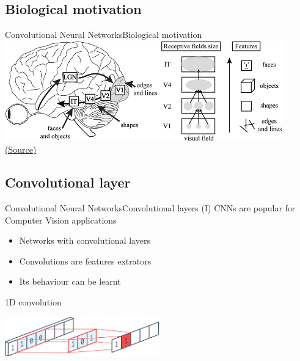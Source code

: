 \documentclass[10pt,compress]{beamer} %
\begin{document}
\subsection{Biological motivation}
\begin{frame}{Convolutional Neural Networks}{Biological motivation}
	\centering
	\includegraphics[width=0.9\textwidth]{figs/cortex.png}\\
	\scriptsize\href{https://www.researchgate.net/publication/267872860_Why_vision_is_not_both_hierarchical_and_feedforward/figures?lo=1}{(Source)}\\
\end{frame}

\subsection{Convolutional layer}
\begin{frame}{Convolutional Neural Networks}{Convolutional layers (I)}
    CNNs are popular for Computer Vision applications
	\begin{itemize}
		\item Networks with convolutional layers
        \item Convolutions are features extrators
        \item Its behaviour can be learnt
	\end{itemize}

    \bigskip 
	\centering 1D convolution \\
    \bigskip 

	\includegraphics[width=0.5\textwidth]{figs/1dconv.png}
\end{frame}
\end{document}
